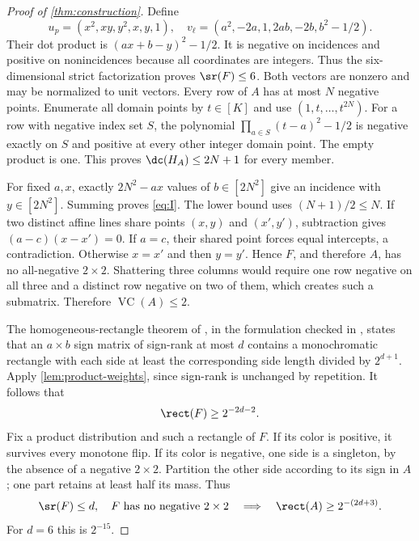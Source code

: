 \begin{proof}[Proof of \cref{thm:construction}]

Define
\[
 u_p=(x^2,xy,y^2,x,y,1),\quad
 v_\ell=(a^2,-2a,1,2ab,-2b,b^2-1/2).
\]
Their dot product is $(ax+b-y)^2-1/2$. It is negative on incidences and positive on nonincidences because all coordinates are integers. Thus the six-dimensional strict factorization proves $\sr(F)\le6$. Both vectors are nonzero and may be normalized to unit vectors. Every row of $A$ has at most $N$ negative points. Enumerate all domain points by $t\in[K]$ and use $(1,t,\ldots,t^{2N})$. For a row with negative index set $S$, the polynomial $\prod_{a\in S}(t-a)^2-1/2$ is negative exactly on $S$ and positive at every other integer domain point. The empty product is one. This proves $\dc(H_A)\le2N+1$ for every member.

For fixed $a,x$, exactly $2N^2-ax$ values of $b\in[2N^2]$ give an incidence with $y\in[2N^2]$. Summing proves \eqref{eq:I}. The lower bound uses $(N+1)/2\le N$. If two distinct affine lines share points $(x,y)$ and $(x',y')$, subtraction gives $(a-c)(x-x')=0$. If $a=c$, their shared point forces equal intercepts, a contradiction. Otherwise $x=x'$ and then $y=y'$. Hence $F$, and therefore $A$, has no all-negative $2\times2$. Shattering three columns would require one row negative on all three and a distinct row negative on two of them, which creates such a submatrix. Therefore $\operatorname{VC}(A)\le2$.

The homogeneous-rectangle theorem of \citet{APP05}, in the formulation checked in \citet[Theorem 1.9]{HHPTZ22}, states that an $a\times b$ sign matrix of sign-rank at most $d$ contains a monochromatic rectangle with each side at least the corresponding side length divided by $2^{d+1}$. Apply \cref{lem:product-weights}, since sign-rank is unchanged by repetition. It follows that
\begin{equation}\label{eq:sharp-rect}
 \rect(F)\ge2^{-2d-2}.
\end{equation}
Fix a product distribution and such a rectangle of $F$. If its color is positive, it survives every monotone flip. If its color is negative, one side is a singleton, by the absence of a negative $2\times2$. Partition the other side according to its sign in $A$; one part retains at least half its mass. Thus
\begin{equation}\label{eq:structural}
 \sr(F)\le d,\quad F\text{ has no negative }2\times2
 \quad\Longrightarrow\quad \rect(A)\ge2^{-(2d+3)}.
\end{equation}
For $d=6$ this is $2^{-15}$. 


\end{proof}
